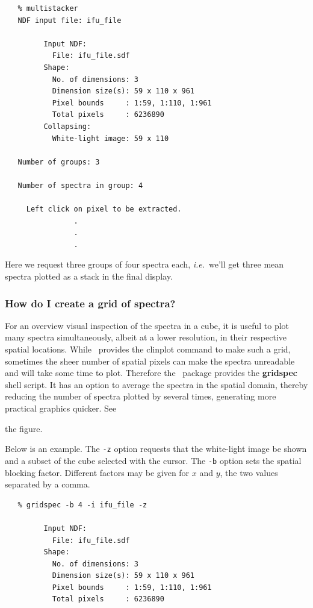 \documentclass[twoside,11pt]{article}
\newcommand{\xref}[3]{#1}
\newcommand{\xlabel}[1]{}
\begin{document}
{\small\begin{verbatim}
   % multistacker
   NDF input file: ifu_file
 
         Input NDF:
           File: ifu_file.sdf
         Shape:
           No. of dimensions: 3
           Dimension size(s): 59 x 110 x 961
           Pixel bounds     : 1:59, 1:110, 1:961
           Total pixels     : 6236890
         Collapsing:
           White-light image: 59 x 110
  
   Number of groups: 3
 
   Number of spectra in group: 4
  
     Left click on pixel to be extracted.
                .
                .
                .	     
\end{verbatim}\normalsize

Here we request three groups of four spectra each, \emph{i.e.}\ we'll
get three mean spectra plotted as a stack in the final display.

\subsubsection{\label{sc16_gridmap}How do I create a grid of
spectra?\xlabel{sc16_gridmap}}

For an overview visual inspection of the spectra in a cube, it is useful
to plot many spectra simultaneously, albeit at a lower resolution, in
their respective spatial locations.  While \KAPPA\ provides the
\xref{clinplot}{sun95}{CLINPLOT} command to make such a grid, sometimes
the sheer number of spatial pixels can make the spectra unreadable and
will take some time to plot.  Therefore the \DATACUBE\ package
provides the \xref{{\bf gridspec}}{sun237}{gridspec} shell script.  It
has an option to average the spectra in the spatial domain, thereby
reducing the number of spectra plotted by several times, generating
more practical graphics quicker.   See
\begin{htmlonly}
the figure.
\end{htmlonly}
  Below is an
example.  The {\tt -z} option requests that the white-light image be
shown and a subset of the cube selected with the cursor. The {\tt -b}
option sets the spatial blocking factor.  Different factors may be
given for $x$ and $y$, the two values separated by a comma.

\small\begin{verbatim}
   % gridspec -b 4 -i ifu_file -z

         Input NDF:
           File: ifu_file.sdf
         Shape:
           No. of dimensions: 3
           Dimension size(s): 59 x 110 x 961
           Pixel bounds     : 1:59, 1:110, 1:961
           Total pixels     : 6236890


\end{verbatim}}
\end{document}
